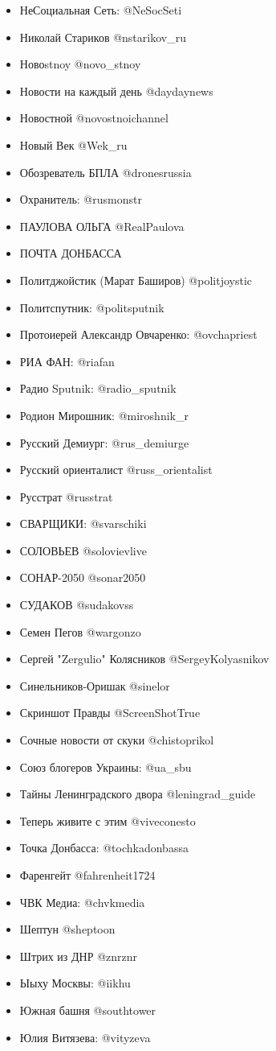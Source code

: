 \begin{itemize}
\item НеСоциальная Сеть: @NeSocSeti
\item Николай Стариков @nstarikov\_ru
\item Новоstnoy @novo\_stnoy
\item Новости на каждый день @daydaynews
\item Новостной @novostnoichannel
\item Новый Век @Wek\_ru
\item Обозреватель БПЛА @dronesrussia
\item Охранитель: @rusmonstr
\item ПАУЛОВА ОЛЬГА @RealPaulova  
\item ПОЧТА ДОНБАССА 
\item Политджойстик (Марат Баширов) @politjoystic
\item Политспутник: @politsputnik
\item Протоиерей Александр Овчаренко: @ovchapriest
\item РИА ФАН: @riafan
\item Радио Sputnik: @radio\_sputnik
\item Родион Мирошник: @miroshnik\_r 
\item Русский Демиург: @rus\_demiurge
\item Русский ориенталист @russ\_orientalist
\item Русстрат @russtrat
\item СВАРЩИКИ: @svarschiki
\item СОЛОВЬЕВ @solovievlive
\item СОНАР-2050 @sonar2050
\item СУДАКОВ @sudakovss
\item Семен Пегов @wargonzo 
\item Сергей "Zergulio" Колясников @SergeyKolyasnikov 
\item Синельников-Оришак @sinelor
\item Скриншот Правды @ScreenShotTrue
\item Сочные новости от скуки @chistoprikol
\item Союз блогеров Украины: @ua\_sbu 
\item Тайны Ленинградского двора @leningrad\_guide
\item Теперь живите с этим @viveconesto
\item Точка Донбасса: @tochkadonbassa
\item Фаренгейт @fahrenheit1724
\item ЧВК Медиа: @chvkmedia
\item Шептун @sheptoon
\item Штрих из ДНР @znrznr 
\item Ыыху Москвы: @iikhu
\item Южная башня @southtower
\item Юлия Витязева: @vityzeva
\end{itemize}

